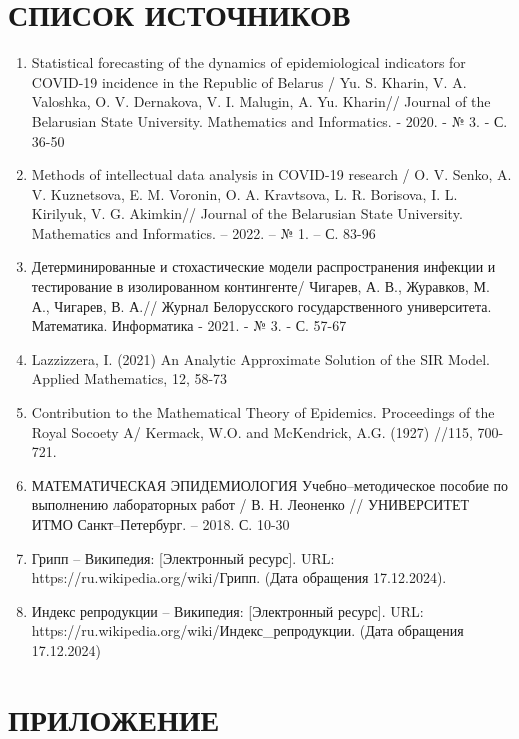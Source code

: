 \documentclass[a4paper, 14pt]{extreport}
\numberwithin{equation}{section}
\begin{document}
	\chapter*{СПИСОК ИСТОЧНИКОВ}
	\begin{enumerate}
		\item Statistical forecasting of the dynamics of epidemiological indicators for COVID-19 incidence in the Republic of Belarus / Yu. S. Kharin, V. A. Valoshka, O. V. Dernakova, V. I. Malugin, A. Yu. Kharin// Journal of the Belarusian State University. Mathematics and Informatics. - 2020. - № 3. - С. 36-50
		\item Methods of intellectual data analysis in COVID-19 research / O. V. Senko, A. V. Kuznetsova, E. M. Voronin, O. A. Kravtsova, L. R. Borisova, I. L. Kirilyuk, V. G. Akimkin// Journal of the Belarusian State University. Mathematics and Informatics. – 2022. – № 1. – С. 83-96
		\item Детерминированные и стохастические модели распространения инфекции и тестирование в изолированном контингенте/ Чигарев, А. В., Журавков, М. А., Чигарев, В. А.// Журнал Белорусского государственного университета. Математика. Информатика - 2021. - № 3. - С. 57-67
		\item Lazzizzera, I. (2021) An Analytic Approximate Solution of the SIR Model. Applied Mathematics, 12, 58-73
		\item Contribution to the Mathematical Theory of Epidemics. Proceedings of the Royal Socoety A/ Kermack, W.O. and McKendrick, A.G. (1927) //115, 700-721.
		\item МАТЕМАТИЧЕСКАЯ ЭПИДЕМИОЛОГИЯ Учебно–методическое пособие
		по выполнению лабораторных работ / В. Н. Леоненко // УНИВЕРСИТЕТ ИТМО Санкт–Петербург. -- 2018. С. 10-30
		\item Грипп -- Википедия: [Электронный ресурс]. URL:\\ https://ru.wikipedia.org/wiki/Грипп. (Дата обращения 17.12.2024).
		\item Индекс репродукции -- Википедия: [Электронный ресурс]. URL:\\
		https://ru.wikipedia.org/wiki/Индекс\_репродукции. 
		(Дата обращения\\ 17.12.2024)
	\end{enumerate}
	\newpage
	\chapter*{ПРИЛОЖЕНИЕ}
\end{document}
